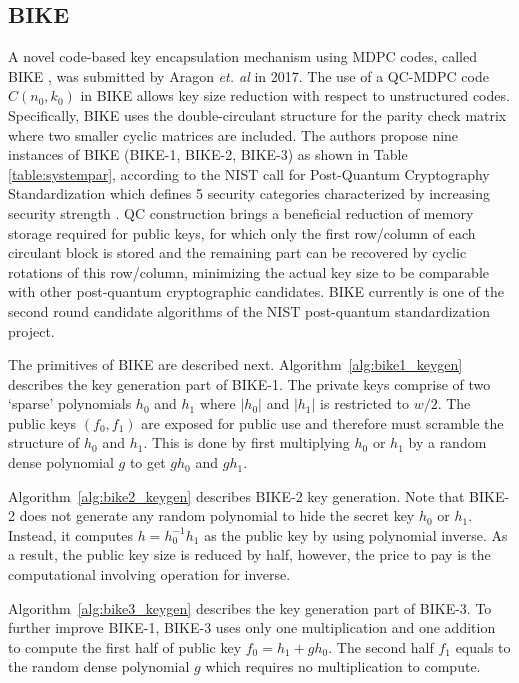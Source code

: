 \documentclass[runningheads]{llncs}
\begin{document}
\subsection{BIKE}
A novel code-based key encapsulation mechanism using MDPC codes, called BIKE \cite{aragon2017bike}, was submitted by Aragon \textit{et. al} in 2017. The use of a QC-MDPC code $C(n_0,k_0)$ in BIKE allows key size reduction with respect to unstructured codes. Specifically, BIKE uses the double-circulant structure for the parity check matrix where two smaller cyclic matrices are included. The authors propose nine instances of BIKE (BIKE-1, BIKE-2, BIKE-3) as shown in Table \ref{table:systempar}, according to the NIST call for Post-Quantum Cryptography Standardization which defines 5 security categories characterized by increasing security strength \cite{pqc2017}.
 QC construction brings a beneficial reduction of memory storage required for public keys, for which only the first row/column of each circulant block is stored and the remaining part can be recovered by cyclic rotations of this row/column,  minimizing the actual key size to be comparable with other post-quantum cryptographic candidates.  BIKE currently is one of the second round candidate algorithms of the NIST post-quantum standardization project.

The primitives of BIKE are described next.
Algorithm~\ref{alg:bike1_keygen} describes the key generation part of BIKE-1. The private keys comprise of two `sparse' polynomials $h_0$ and $h_1$ where $|h_0|$ and $|h_1|$ is restricted to $w/2$. The public keys $(f_0,f_1)$ are exposed for public use and therefore must scramble the structure of $h_0$ and $h_1$. This is done by first multiplying $h_0$ or $h_1$ by a random dense polynomial $g$ to get $gh_0$ and $gh_1$.

Algorithm~\ref{alg:bike2_keygen} describes BIKE-2 key generation. Note that BIKE-2 does not generate any random polynomial to hide the secret key $h_0$ or $h_1$. Instead, it computes $h=h_0^{-1}h_1$ as the public key by using polynomial inverse. As a result, the public key size is reduced by half, however, the price to pay is the computational involving operation for inverse.

Algorithm~\ref{alg:bike3_keygen} describes the key generation part of BIKE-3. To further improve BIKE-1, BIKE-3 uses only one multiplication and one addition to compute the first half of public key $f_0=h_1+gh_0$. The second half $f_1$ equals to the random dense polynomial $g$ which requires no multiplication to compute.
\end{document}
